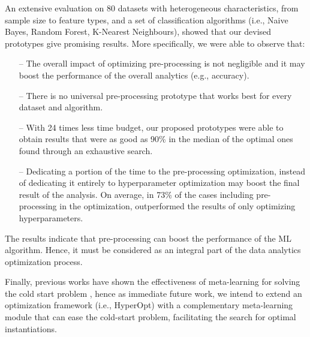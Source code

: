 An extensive evaluation on 80 datasets with heterogeneous characteristics, from sample size to feature types, and a set of classification algorithms (i.e., Naive Bayes, Random Forest, K-Nearest Neighbours), showed that our devised prototypes give promising results.
More specifically, we were able to observe that:
\begin{itemize}
    \item [--] The overall impact of optimizing pre-processing is not negligible and it may boost the performance of the overall analytics (e.g., accuracy).
    \item [--] There is no universal pre-processing prototype that works best for every dataset and algorithm.
    \item [--] With 24 times less time budget, our proposed prototypes were able to obtain results that were as good as 90\% in the median of the optimal ones found through an exhaustive search.
    \item [--] Dedicating a portion of the time to the pre-processing optimization, instead of dedicating it entirely to hyperparameter optimization may boost %
    the final result of the analysis.
	On average, in 73\% of the cases including pre-processing in the optimization, outperformed the results of only optimizing hyperparameters.
\end{itemize}

The results indicate that pre-processing can boost the performance of the ML algorithm.
Hence, it must be considered as an integral part of the data analytics optimization process.

Finally, previous works have shown the effectiveness of meta-learning for solving the cold start problem \cite{Feurer15AAAI}, hence as immediate future work, we intend to extend an optimization framework (i.e., HyperOpt) with a complementary meta-learning module that can ease the cold-start problem, facilitating the search for optimal instantiations.